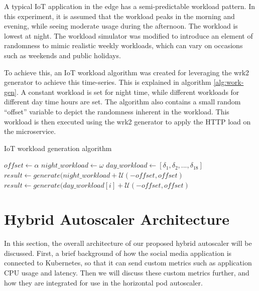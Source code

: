 A typical IoT application in the edge has a semi-predictable workload pattern. In this experiment, it is assumed that the workload peaks in the morning and evening, while seeing moderate usage during the afternoon. The workload is lowest at night. The workload simulator was modified to introduce an element of randomness to mimic realistic weekly workloads, which can vary on occasions such as weekends and public holidays.\par

To achieve this, an IoT workload algorithm was created for leveraging the wrk2 generator to achieve this time-series. This is explained in algorithm \ref{alg:work-gen}. A constant workload is set for night time, while different workloads for different day time hours are set. The algorithm also contains a small random ``offset'' variable to depict the randomness inherent in the workload. This workload is then executed using the wrk2 generator to apply the HTTP load on the microservice.

\begin{algorithm}
    \caption{IoT workload generation algorithm}
    \label{alg:work-gen}
    \begin{algorithmic}
        \State $offset \gets \alpha$
        \State $night\_workload \gets \omega$
        \State $day\_workload \gets [ \delta_1, \delta_2, ... , \delta_{18}]$
                \State $result \gets generate(night\_workload + \mathcal{U}(-offset,offset)$
            \EndFor
                \State $result \gets generate(day\_workload[i] + \mathcal{U}(-offset,offset)$
            \EndFor
        \EndWhile
    \end{algorithmic}
\end{algorithm}

\section{Hybrid Autoscaler Architecture}
\label{ref:hybrid-auto-arch}


In this section, the overall architecture of our proposed hybrid autoscaler will be discussed. First, a brief background of how the social media application is connected to Kubernetes, so that it can send custom metrics such as application CPU usage and latency. Then we will discuss these custom metrics further, and how they are integrated for use in the horizontal pod autoscaler.\par

